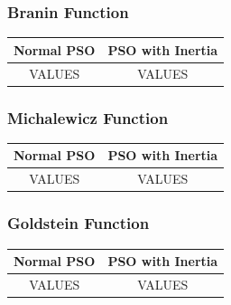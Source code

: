 \subsubsection{Branin Function}
\begin{center}
	\begin{tabular}{| c | c |}
	\hline
	Normal PSO & PSO with Inertia \\  \hline
	VALUES & VALUES \\ \hline
	\end{tabular}
\end{center}
\subsubsection{Michalewicz Function}
\begin{center}
	\begin{tabular}{| c | c |}
	\hline
	Normal PSO & PSO with Inertia \\  \hline
	VALUES & VALUES \\ \hline
	\end{tabular}
\end{center}
\subsubsection{Goldstein Function}
\begin{center}
	\begin{tabular}{| c | c |}
	\hline
	Normal PSO & PSO with Inertia \\  \hline
	VALUES & VALUES \\ \hline 
	\end{tabular}
\end{center}
